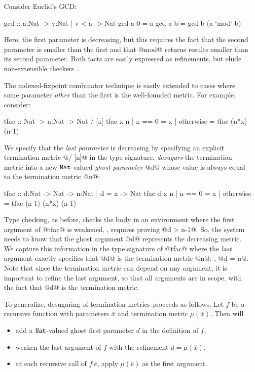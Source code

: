 Consider Euclid's GCD:
%
\begin{code}
  gcd :: a:Nat -> {v:Nat | v < a} -> Nat 
  gcd a 0 = a
  gcd a b = gcd b (a `mod` b)
\end{code}
%
Here, the first parameter is decreasing, but this requires
the fact that the second parameter is smaller than the first 
and that @mod@ returns results smaller than its second 
parameter. Both facts are easily expressed as refinements, 
but elude non-extensible checkers~\cite{Giesl11}.

The indexed-fixpoint combinator technique is easily extended to 
cases where some parameter \emph{other} than the first is the 
well-founded metric. For example, consider: 
%
\begin{code}
  tfac     :: Nat -> n:Nat -> Nat / [n] 
  tfac x n | n == 0    = x
           | otherwise = tfac (n*x) (n-1)
\end{code}
%
We specify that the \emph{last parameter} is decreasing by 
specifying an explicit termination metric @/ [n]@ in the 
type signature.
%
\toolname \emph{desugars} the 
termination metric into a new $\mathtt{Nat}$-valued \emph{ghost parameter} @d@ 
whose value is always equal to the termination metric @n@:
\begin{code}
  tfac :: d:Nat -> Nat -> {n:Nat | d = n} -> Nat 
  tfac d x n | n == 0    = x
             | otherwise = tfac (n-1) (n*x) (n-1)
\end{code}
%
Type checking, as before, checks the body in an environment where 
the first argument of @tfac@ is weakened, \ie, requires proving @d > n-1@.
%
So, the system needs to know that the ghost argument @d@ 
represents the decreasing metric.
%
We capture this information in the type signature of @tfac@ where the \emph{last} 
argument exactly specifies that @d@ is the termination metric @n@, \ie, @d = n@.
%
Note that since the termination metric can depend on any argument, 
it is important to refine the last argument,
so that all arguments are in scope, with the fact that @d@ is the termination metric.

To generalize, desugaring of termination metrics proceeds as follows.
Let $f$ be a recursive function with parameters $\overline{x}$ and 
termination metric $\mu(\overline{x})$. Then \toolname will
\begin{itemize}
\item add a $\mathtt{Nat}$-valued ghost first parameter $d$ in the definition of $f$, 
\item weaken the last argument of $f$ with the refinement $d = \mu(\overline{x})$, %
\item at each recursive call of $f\ \overline{e}$, 
apply $\mu(\overline{e})$ as the first argument.
\end{itemize}  
%

